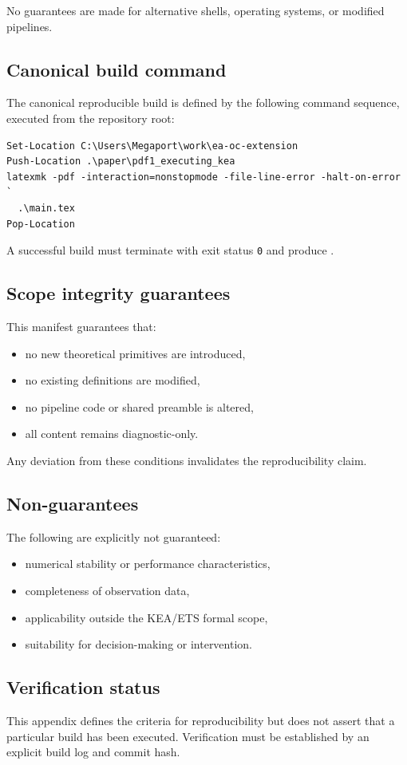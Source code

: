 No guarantees are made for alternative shells, operating systems, or modified pipelines.

\subsection{Canonical build command}
The canonical reproducible build is defined by the following command sequence,
executed from the repository root:

\begin{verbatim}
Set-Location C:\Users\Megaport\work\ea-oc-extension
Push-Location .\paper\pdf1_executing_kea
latexmk -pdf -interaction=nonstopmode -file-line-error -halt-on-error `
  .\main.tex
Pop-Location
\end{verbatim}

A successful build must terminate with exit status \texttt{0} and produce
.

\subsection{Scope integrity guarantees}
This manifest guarantees that:
\begin{itemize}
  \item no new theoretical primitives are introduced,
  \item no existing definitions are modified,
  \item no pipeline code or shared preamble is altered,
  \item all content remains diagnostic-only.
\end{itemize}

Any deviation from these conditions invalidates the reproducibility claim.

\subsection{Non-guarantees}
The following are explicitly not guaranteed:
\begin{itemize}
  \item numerical stability or performance characteristics,
  \item completeness of observation data,
  \item applicability outside the KEA/ETS formal scope,
  \item suitability for decision-making or intervention.
\end{itemize}

\subsection{Verification status}
This appendix defines the criteria for reproducibility but does not assert
that a particular build has been executed.
Verification must be established by an explicit build log and commit hash.
